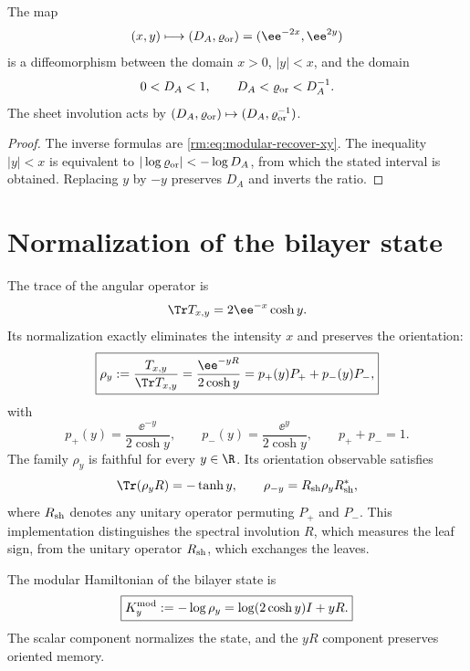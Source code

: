 \begin{proposition}
\label{rm:prop:modular-separation}
The map
\[
 (x,y)\longmapsto(D_A,\varrho_{\rm or})
 =(\ee^{-2x},\ee^{2y})
\]
is a diffeomorphism between the domain \(x>0\), \(|y|<x\), and the domain
\[
 0<D_A<1,
 \qquad
 D_A<\varrho_{\rm or}<D_A^{-1}.
\]
The sheet involution acts by
\(
(D_A,\varrho_{\rm or})\mapsto(D_A,\varrho_{\rm or}^{-1})
\).
\end{proposition}

\begin{proof}
The inverse formulas are \cref{rm:eq:modular-recover-xy}. The inequality
\(|y|<x\) is equivalent to
\(|\log\varrho_{\rm or}|<-\log D_A\), from which the stated interval is obtained.
Replacing \(y\) by \(-y\) preserves \(D_A\) and inverts the
ratio.
\end{proof}

\section{Normalization of the bilayer state}

The trace of the angular operator is
\begin{equation}
 \Tr T_{x,y}=2\ee^{-x}\cosh y.
 \label{rm:eq:modular-trace-T}
\end{equation}
Its normalization exactly eliminates the intensity \(x\) and preserves the
orientation:
\begin{equation}
 \boxed{
 \rho_y:=\frac{T_{x,y}}{\Tr T_{x,y}}
 =\frac{\ee^{-yR}}{2\cosh y}
 =p_+(y)P_++p_-(y)P_- ,}
 \label{rm:eq:modular-rho}
\end{equation}
with
\begin{equation}
 p_+(y)=\frac{\ee^{-y}}{2\cosh y},
 \qquad
 p_-(y)=\frac{\ee^{y}}{2\cosh y},
 \qquad
 p_++p_-=1.
 \label{rm:eq:modular-probabilities}
\end{equation}
The family \(\rho_y\) is faithful for every \(y\in\R\). Its orientation
observable satisfies
\begin{equation}
 \Tr(\rho_yR)=-\tanh y,
 \qquad
 \rho_{-y}=R_{\rm sh}\rho_yR_{\rm sh}^*,
 \label{rm:eq:modular-orientation-expectation}
\end{equation}
where \(R_{\rm sh}\) denotes any unitary operator permuting
\(P_+\) and \(P_-\). This implementation distinguishes the spectral involution
\(R\), which measures the leaf sign, from the unitary operator \(R_{\rm sh}\),
which exchanges the leaves.

\begin{definition}
\label{rm:def:holographic-modular-hamiltonian}
The modular Hamiltonian of the bilayer state is
\begin{equation}
 \boxed{
 K_y^{\rm mod}:=-\log\rho_y
 =\log(2\cosh y)I+yR.}
 \label{rm:eq:modular-Hamiltonian}
\end{equation}
The scalar component normalizes the state, and the \(yR\) component
preserves oriented memory.
\end{definition}

